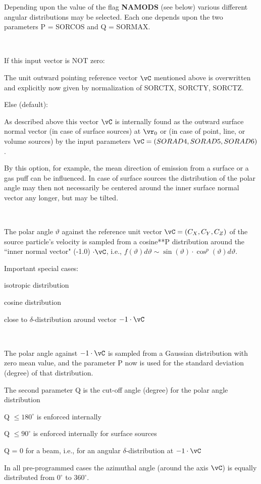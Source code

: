 \begin{list}{ }{}
Depending upon the value of the
flag {\bf NAMODS} (see below) various different angular distributions
may be selected. Each one depends upon the two parameters P = SORCOS and
Q = SORMAX.
\item[{\bf SORCTX, SORCTY, SORCTZ }]~

If this input vector is NOT zero:

The unit outward pointing reference vector $\vC $ mentioned
above is overwritten and explicitly now given by normalization of
SORCTX, SORCTY, SORCTZ.

Else (default):

As described above this vector $\vC$ is internally found as the
outward surface normal vector (in case of surface sources)
at $\vr_0$ or (in case of point, line, or volume sources)
by the input parameters $\vC =(SORAD4,SORAD5,SORAD6)$.

By this option, for example, the mean direction of emission
from
a surface or a gas puff can be influenced.
In case of surface sources the distribution
of the polar angle may then not necessarily be centered
around the inner
surface normal vector any longer, but may be tilted.

\begin{list}{ }{}
\item[{NAMODS = 1 }]~

The polar angle $\vartheta$ against the reference unit vector
$\vC = (C_X,C_Y,C_Z)$ of the source particle's velocity is sampled from
a cosine**P distribution around the ``inner normal vector" (-1.0)
$\cdot \vC $, i.e., $f( \vartheta )   d \vartheta   \sim \sin(
\vartheta )  \cdot  \cos^p ( \vartheta )   d \vartheta$.

Important special cases:
\begin{list}{ }{}
\item[{P = 0 }]
isotropic distribution
\item[{P = 1 }]
cosine distribution
\item[{P $\gg$ 1 }]
close to $\delta$-distribution around vector $-1  \cdot \vC $
\end{list}
\item[{NAMODS = 2 }]~

The polar angle against $-1  \cdot  \vC $
is sampled from a
Gaussian distribution with zero mean value, and
the parameter P now is used
for the standard deviation (degree) of that distribution.
\end{list}
The second parameter Q is the cut-off angle (degree)
for the polar angle distribution
\begin{list}{ }{}
\item[{note:  }]
Q $\le 180^{\circ}$  is enforced internally

Q $\le 90^{\circ}$ is enforced internally for surface sources

Q = 0  for a beam, i.e., for an angular $\delta$-distribution at
$-1  \cdot  \vC $
\end{list}


\end{list}
In all pre-programmed
cases the azimuthal angle (around the axis $\vC$)
is equally distributed from
$0^{\circ}$ to  $360^{\circ}$.

